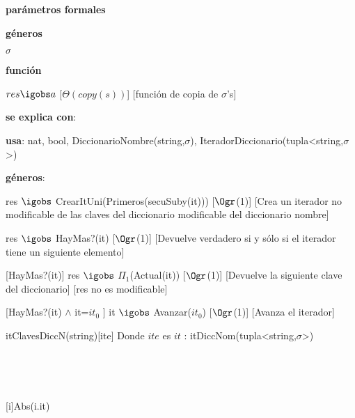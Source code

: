 \begin{Interfaz}

		\textbf{parámetros formales}\parindent\\
	\parbox{1.7cm}{\textbf{géneros}} $\sigma$\\
	\parbox[t]{1.7cm}{\textbf{función}}\parbox[t]{\textwidth-2\parindent-1.7cm}{%
	    	{$res \igobs a$}
		[$\Theta(copy(s))$]
		[función de copia de $\sigma$'s]
	}
	
	\textbf{se explica con}: 
	
	\textbf{usa}: nat, bool, DiccionarioNombre(string,$\sigma$), IteradorDiccionario(tupla<string,$\sigma$>)
	
	\textbf{géneros}: 
	

	{res $\igobs$ CrearItUni(Primeros(secuSuby(it)))}
	[$\Ogr$(1)]
	[Crea un iterador no modificable de las claves del diccionario modificable del diccionario nombre]
	
	
	{res $\igobs$ HayMas?(it)}
	[$\Ogr$(1)]
	[Devuelve verdadero si y sólo si el iterador tiene un siguiente elemento]
	
	[HayMas?(it)]
	{res $\igobs$ $\Pi_1$(Actual(it))}
	[$\Ogr$(1)]
	[Devuelve la siguiente clave del diccionario]
	[res no es modificable]
	
	[HayMas?(it) $\land$ it=$it_0$ ]
	{it $\igobs$ Avanzar($it_0$)}
	[$\Ogr$(1)]
	[Avanza el iterador]
	
	
\end{Interfaz}

\begin{Representacion}

	\begin{Estructura}{itClavesDiccN(string)}[ite]
		Donde $ite$ es $it$ : itDiccNom(tupla<string,$\sigma$>)
	\end{Estructura}
	
~
	
	
~

	{Abs(i.it)}
	

\end{Representacion}